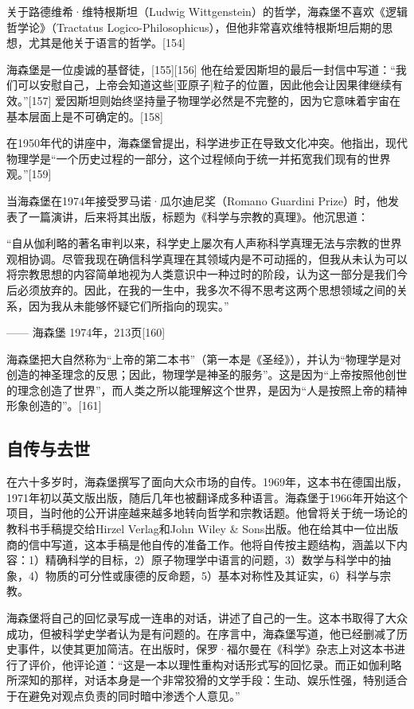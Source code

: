关于路德维希·维特根斯坦（Ludwig Wittgenstein）的哲学，海森堡不喜欢《逻辑哲学论》（Tractatus Logico-Philosophicus），但他非常喜欢维特根斯坦后期的思想，尤其是他关于语言的哲学。[154]

海森堡是一位虔诚的基督徒，[155][156] 他在给爱因斯坦的最后一封信中写道：“我们可以安慰自己，上帝会知道这些[亚原子]粒子的位置，因此他会让因果律继续有效。”[157] 爱因斯坦则始终坚持量子物理学必然是不完整的，因为它意味着宇宙在基本层面上是不可确定的。[158]

在1950年代的讲座中，海森堡曾提出，科学进步正在导致文化冲突。他指出，现代物理学是“一个历史过程的一部分，这个过程倾向于统一并拓宽我们现有的世界观。”[159]  

当海森堡在1974年接受罗马诺·瓜尔迪尼奖（Romano Guardini Prize）时，他发表了一篇演讲，后来将其出版，标题为《科学与宗教的真理》。他沉思道：

“自从伽利略的著名审判以来，科学史上屡次有人声称科学真理无法与宗教的世界观相协调。尽管我现在确信科学真理在其领域内是不可动摇的，但我从未认为可以将宗教思想的内容简单地视为人类意识中一种过时的阶段，认为这一部分是我们今后必须放弃的。因此，在我的一生中，我多次不得不思考这两个思想领域之间的关系，因为我从未能够怀疑它们所指向的现实。”

—— 海森堡 1974年，213页[160]  

海森堡把大自然称为“上帝的第二本书”（第一本是《圣经》），并认为“物理学是对创造的神圣理念的反思；因此，物理学是神圣的服务”。这是因为“上帝按照他创世的理念创造了世界”，而人类之所以能理解这个世界，是因为“人是按照上帝的精神形象创造的”。[161]
\subsection{自传与去世}
在六十多岁时，海森堡撰写了面向大众市场的自传。1969年，这本书在德国出版，1971年初以英文版出版，随后几年也被翻译成多种语言。海森堡于1966年开始这个项目，当时他的公开讲座越来越多地转向哲学和宗教话题。他曾将关于统一场论的教科书手稿提交给Hirzel Verlag和John Wiley & Sons出版。他在给其中一位出版商的信中写道，这本手稿是他自传的准备工作。他将自传按主题结构，涵盖以下内容：1）精确科学的目标，2）原子物理学中语言的问题，3）数学与科学中的抽象，4）物质的可分性或康德的反命题，5）基本对称性及其证实，6）科学与宗教。

海森堡将自己的回忆录写成一连串的对话，讲述了自己的一生。这本书取得了大众成功，但被科学史学者认为是有问题的。在序言中，海森堡写道，他已经删减了历史事件，以使其更加简洁。在出版时，保罗·福尔曼在《科学》杂志上对这本书进行了评价，他评论道：“这是一本以理性重构对话形式写的回忆录。而正如伽利略所深知的那样，对话本身是一个非常狡猾的文学手段：生动、娱乐性强，特别适合于在避免对观点负责的同时暗中渗透个人意见。”

